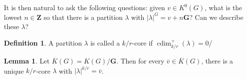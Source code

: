 \documentclass{amsart}[12pt]
\theoremstyle{definition}
\newtheorem{lemma}[dummy]{Lemma}
\newtheorem{definition}[dummy]{Definition}
\newtheorem{question}{Question}
\newcommand{\Z}{\mathbf{Z}}
\newcommand{\C}{\mathbf{C}}
\newcommand{\Reg}{\mathbf{G}}
\DeclareMathOperator{\cdim}{cdim}
\begin{document}
It is then natural to ask the following questions: given $v\in K^0(G)$, what is the lowest $n\in\Z$ so that there is a partition $\lambda$ with $|\lambda|^G=v+n\Reg$?  Can we describe these $\lambda$?  
\begin{definition}
A partition $\lambda$ is called a $k/r$-core if $\cdim^+_{k/r}(\lambda)=0$/
\end{definition}
  
\begin{lemma}
Let $\overline{K}(G)=K(G)/\Reg$.  Then for every $\overline{v}\in\overline{K}(G)$, there is a unique $k/r$-core $\lambda$ with $|\lambda|^{k/r}=\overline{v}$.
\end{lemma}











\end{document}
